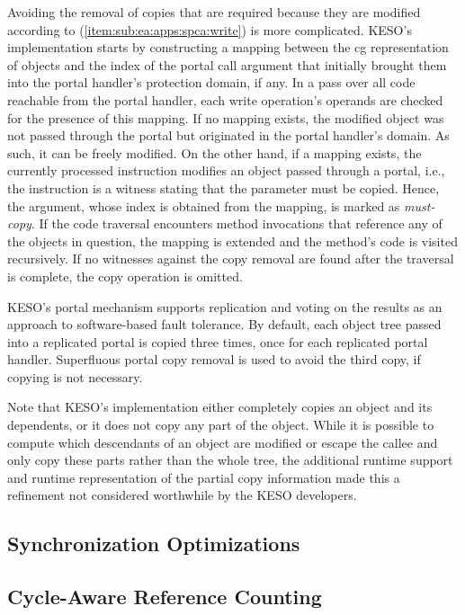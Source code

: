 			Avoiding the removal of copies that are required because they are modified according to
			(\ref{item:sub:ea:apps:spca:write}) is more complicated. KESO's implementation starts by constructing a mapping
			between the \gls{cg} representation of objects and the index of the portal call argument that initially brought
			them into the portal handler's protection domain, if any. In a pass over all code reachable from the portal
			handler, each write operation's operands are checked for the presence of this mapping. If no mapping exists, the
			modified object was not passed through the portal but originated in the portal handler's domain. As such, it can
			be freely modified. On the other hand, if a mapping exists, the currently processed instruction modifies an object
			passed through a portal, i.e., the instruction is a witness stating that the parameter must be copied. Hence, the
			argument, whose index is obtained from the mapping, is marked as \emph{must-copy}. If the code traversal
			encounters method invocations that reference any of the objects in question, the mapping is extended and the
			method's code is visited recursively. If no witnesses against the copy removal are found after the traversal is
			complete, the copy operation is omitted.

			KESO's portal mechanism supports replication and voting on the results as an approach to software-based fault
			tolerance. By default, each object tree passed into a replicated portal is copied three times, once for each
			replicated portal handler. Superfluous portal copy removal is used to avoid the third copy, if copying is not
			necessary.

			Note that KESO's implementation either completely copies an object and its dependents, or it does not copy any
			part of the object. While it is possible to compute which descendants of an object are modified or escape the
			callee and only copy these parts rather than the whole tree, the additional runtime support and runtime
			representation of the partial copy information made this a refinement not considered worthwhile by the KESO
			developers.

		\subsection{Synchronization Optimizations}
			\label{sub:ea:apps:sync}

		\subsection{Cycle-Aware Reference Counting}
			\label{sub:ea:apps:cycledescriptors}
